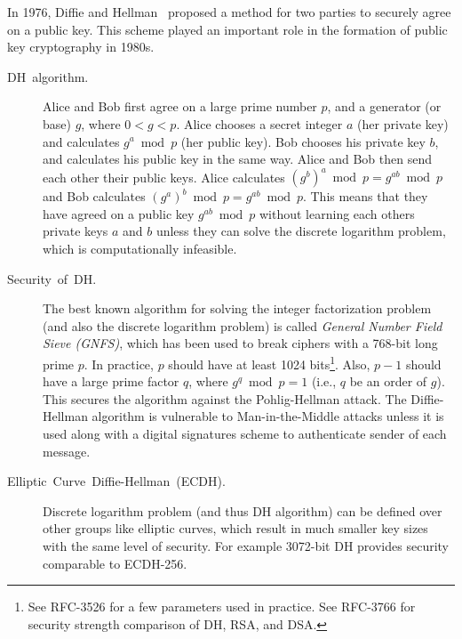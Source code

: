 \documentclass[11pt]{article}
\theoremstyle{plain}
\begin{document}
\label{sec:diffie-hellman} In 1976, Diffie and Hellman~\cite{Diffie:2006:NDC:2263321.2269104}
proposed a method for two parties to securely agree on a public key.
This scheme played an important role in the formation of public key
cryptography in 1980s.
\begin{description}
	\item [{DH~algorithm.}] Alice and Bob first agree on a large prime number
	$p$, and a generator (or base) $g$, where $0<g<p$. Alice chooses
	a secret integer $a$ (her private key) and calculates $g^{a}\bmod p$
	(her public key). Bob chooses his private key $b$, and calculates
	his public key in the same way. Alice and Bob then send each other
	their public keys. Alice calculates $(g^{b})^{a}\bmod p=g^{ab}\bmod p$
	and Bob calculates $(g^{a})^{b}\bmod p=g^{ab}\bmod p$. This means
	that they have agreed on a public key $g^{ab}\bmod p$ without learning
	each others private keys $a$ and $b$ unless they can solve the discrete
	logarithm problem, which is computationally infeasible.
	\item [{Security~of~DH.}] The best known algorithm for solving the integer
	factorization problem (and also the discrete logarithm problem) is
	called \emph{General Number Field Sieve (GNFS)}, which has been used
	to break ciphers with a 768-bit long prime $p$. In practice, $p$
	should have at least 1024 bits\footnote{See RFC-3526 for a few parameters used in practice. See RFC-3766 for
		security strength comparison of DH, RSA, and DSA.}. Also, $p-1$ should have a large prime factor $q$, where $g^{q}\bmod p=1$
	(i.e., $q$ be an order of $g$). This secures the algorithm against
	the Pohlig-Hellman attack. The Diffie-Hellman algorithm is vulnerable
	to Man-in-the-Middle attacks unless it is used along with a digital
	signatures scheme to authenticate sender of each message.
	\item [{Elliptic~Curve~Diffie-Hellman~(ECDH).}] Discrete logarithm problem
	(and thus DH algorithm) can be defined over other groups like elliptic
	curves, which result in much smaller key sizes with the same level
	of security. For example 3072-bit DH provides security comparable
	to ECDH-256.
\end{description}
\end{document}
